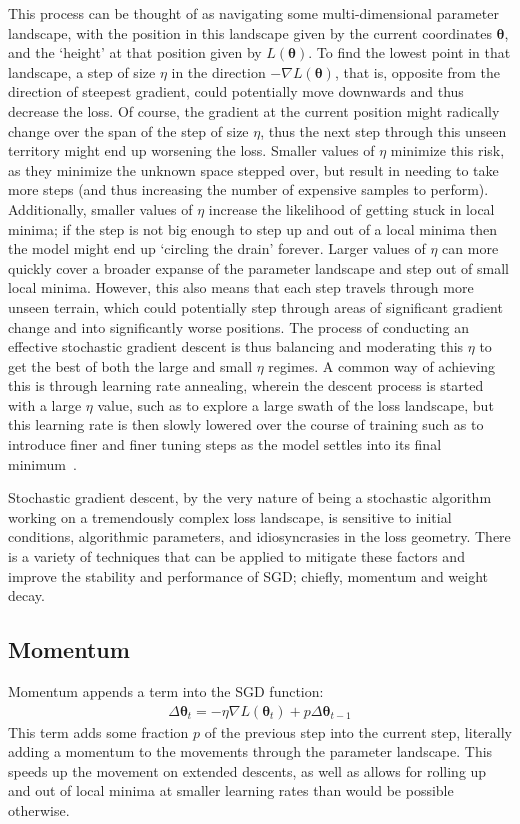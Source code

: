 This process can be thought of as navigating some multi-dimensional parameter landscape, with the position
in this landscape given by the current coordinates $\mathbf{\theta}$, and the `height' at that position given by
$L(\mathbf{\theta})$. To find the lowest point in that landscape, a step of size $\eta$ in
the direction  $-\nabla L(\mathbf{\theta})$, that is, opposite from the direction of steepest gradient, could potentially
move downwards and thus decrease the loss. Of course, the gradient at the current position might radically change
over the span of the step of size $\eta$, thus the next step through this unseen territory might end up worsening the loss.
Smaller values of  $\eta$ minimize this risk, as they minimize the unknown space stepped over, but result in needing
to take more steps (and thus increasing the number of expensive samples to perform). Additionally, smaller values
of $\eta$ increase the likelihood of getting stuck in local minima; if the step is not big enough to step up and out
of a local minima then the model might end up `circling the drain' forever. Larger values of $\eta$ can more quickly cover
a broader expanse of the parameter landscape and step out of small local minima. However, this also means that each
step travels through more unseen terrain, which could potentially step through areas of significant gradient change and into
significantly worse positions. The process of conducting an effective stochastic gradient descent is thus balancing and
moderating this $\eta$ to get the best of both the large and small $\eta$ regimes. A common way of achieving this is
through learning rate annealing, wherein the descent process is started with a large $\eta$ value, such as to explore a
large swath of the loss landscape, but this learning rate is then slowly lowered over the course of training such as to introduce
finer and finer tuning steps as the model settles into its final minimum~\citep{goodfellow2016}.

Stochastic gradient descent, by the very nature of being a stochastic algorithm working on a tremendously complex loss
landscape, is sensitive to initial conditions, algorithmic parameters, and idiosyncrasies in the loss geometry.
There is a variety of techniques that can be applied to mitigate these factors and improve the stability and performance
of SGD; chiefly, momentum and weight decay.

 \subsection{Momentum}
 Momentum appends a term into the SGD function:
 \begin{align}
 \Delta \mathbf{\theta}_t = - \eta \nabla \mathit{L}(\mathbf{\theta}_t) +  p \Delta \mathbf{\theta}_{t-1}
 \end{align}
This term adds some fraction $p$ of the previous step into the current step, literally adding a momentum
to the movements through the parameter landscape. This speeds up the movement on extended descents, as well as allows
for rolling up and out of local minima at smaller learning rates than would be possible otherwise.

